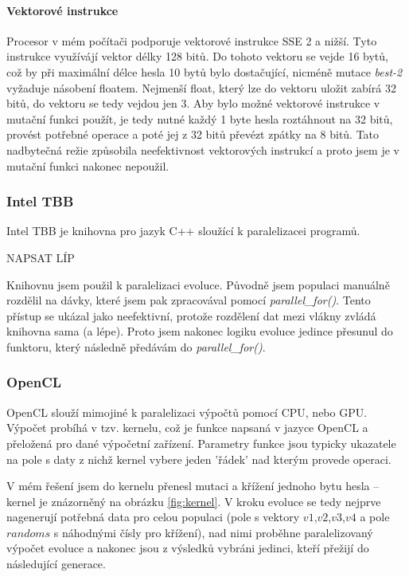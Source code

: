 \documentclass[11pt,a4paper]{scrartcl}
\begin{document}
	\paragraph{Vektorové instrukce} Procesor v mém počítači podporuje vektorové instrukce SSE 2 a nižší. Tyto instrukce využívájí vektor délky 128 bitů. Do tohoto vektoru se vejde 16 bytů, což by při maximální délce hesla 10 bytů bylo dostačující, nicméně mutace \textit{best-2} vyžaduje násobení floatem. Nejmenší float, který lze do vektoru uložit zabírá 32 bitů, do vektoru se tedy vejdou jen 3. Aby bylo možné vektorové instrukce v mutační funkci použít, je tedy nutné každý 1 byte hesla roztáhnout na 32 bitů, provést potřebné operace a poté jej z 32 bitů převézt zpátky na 8 bitů. Tato nadbytečná režie způsobila neefektivnost vektorových instrukcí a proto jsem je v mutační funkci nakonec nepoužil.

	\subsubsection{Intel TBB}
	Intel TBB je knihovna pro jazyk C++ sloužící k paralelizacei programů.
	
	NAPSAT LÍP
	
	 Knihovnu jsem použil k paralelizaci evoluce. Původně jsem populaci manuálně rozdělil na dávky, které jsem pak zpracovával pomocí \textit{parallel\_for()}. Tento přístup se ukázal jako neefektivní, protože rozdělení dat mezi vlákny zvládá knihovna sama (a lépe). Proto jsem nakonec logiku evoluce jedince přesunul do funktoru, který následně předávám do \textit{parallel\_for()}.
	
	\subsubsection{OpenCL}
	OpenCL slouží mimojiné k paralelizaci výpočtů pomocí CPU, nebo GPU. Výpočet probíhá v tzv. kernelu, což je funkce napsaná v jazyce OpenCL a přeložená pro dané výpočetní zařízení. Parametry funkce jsou typicky ukazatele na pole s daty z nichž kernel vybere jeden 'řádek' nad kterým provede operaci.
	
	V mém řešení jsem do kernelu přenesl mutaci a křížení jednoho bytu hesla -- kernel je znázorněný na obrázku \ref{fig:kernel}. V kroku evoluce se tedy nejprve nagenerují potřebná data pro celou populaci (pole s vektory $v1$,$v2$,$v3$,$v4$ a pole $randoms$ s náhodnými čísly pro křížení), nad nimi proběhne paralelizovaný výpočet evoluce a nakonec jsou z výsledků vybráni jedinci, kteří přežijí do následující generace. 
	
\end{document}

